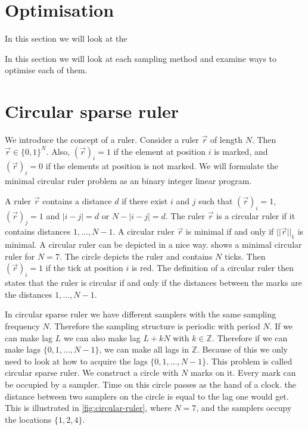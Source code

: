 \documentclass[a4paper, openany, oneside]{memoir}
\begin{document}
\section{Optimisation}
In this section we will look at the 

In this section we will look at each sampling method and examine ways to optimise each of them.


\section{Circular sparse ruler}
We introduce the concept of a ruler. Consider a ruler $\vec{r}$ of length $N$. Then $\vec{r} \in \{0,1\}^N$. Also, $(\vec{r})_i = 1$ if the element at position $i$ is marked, and $(\vec{r})_i = 0$ if the elements at position is not marked. We will formulate the minimal circular ruler problem as an binary integer linear program.

A ruler $\vec{r}$ contains a distance $d$ if there exist $i$ and $j$ such that $(\vec{r})_i = 1$, $(\vec{r})_j = 1$ and $|i-j| = d$ or  $N-|i-j| = d$. The ruler $\vec{r}$ is a circular ruler if it contains distances $ 1, \ldots, N - 1$. A circular ruler $\vec{r}$ is minimal if and only if $||\vec{r}||_1$ is minimal. A circular ruler can be depicted in a nice way.  shows a minimal circular ruler for $N=7$. The circle depicts the ruler and contains $N$ ticks. Then $(\vec{r})_i = 1$ if the tick at position $i$ is red. The definition of a circular ruler then states that the ruler is circular if and only if the distances between the marks are the distances $1,\ldots,N-1$.

In circular sparse ruler we have different samplers with the same sampling frequency $N$. Therefore the sampling structure is periodic with  period $N$.
If we can make lag $L$ we can also make lag $L+kN$ with $k \in \mathbb{Z}$. Therefore if we can make lags $\{0,1,\dots,N-1\}$, we can make all lags in $\mathbb{Z}$. Because of this we only need to look at how to acquire the lags $\{0,1,\dots,N-1\}$. This problem is called circular sparse ruler. We construct a circle with $N$ marks on it. Every mark can be occupied by a sampler. Time on this circle passes as the hand of a clock. the distance between two samplers on the circle is equal to the lag one would get. This is illustrated in \cref{fig:circular-ruler}, where $N=7$, and the samplers occupy the locations $\{1,2,4\}$.
\end{document}
